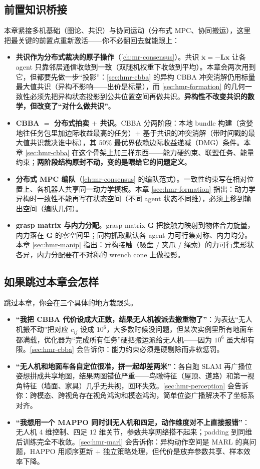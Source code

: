\subsection*{前置知识桥接}
本章紧接多机基础（图论、共识）与协同运动（分布式 MPC、协同搬运），这里把最关键的前置点重新激活——你不必翻回去就能跟上：
\begin{itemize}
  \item \textbf{共识作为分布式裁决的原子操作}（\cref{ch:mr-consensus}）。共识 $\dot{\mathbf{x}}=-\mathbf{L}\mathbf{x}$ 让各 agent 只靠邻居通信收敛到一致（双随机权重下收敛到平均）。本章会两次用到它，但都要先做一步“投影”：\cref{sec:hmr-cbba} 的异构 CBBA 冲突消解仍用标量最大值共识（异构不影响——出价是标量），而 \cref{sec:hmr-formation} 的几何一致性必须先把异构状态投影到公共位置空间再做共识。\textbf{异构性不改变共识的数学，但改变了“对什么做共识”}。
  \item \textbf{CBBA $=$ 分布式拍卖 $+$ 共识}。CBBA 分两阶段：本地 bundle 构建（贪婪地往任务包里加边际收益最高的任务）$+$ 基于共识的冲突消解（带时间戳的最大值共识裁决谁中标），其 $50\%$ 最优界依赖边际收益递减（DMG）条件。本章 \cref{sec:hmr-cbba} 在这个骨架上加三样东西——能力硬约束、联盟任务、能量约束；\textbf{两阶段结构原封不动，变的是喂给它的问题定义}。
  \item \textbf{分布式 MPC 编队}（\cref{ch:mr-consensus} 的编队范式）。一致性约束写在相对位置上、各机器人共享同一动力学模板。本章 \cref{sec:hmr-formation} 指出：动力学异构时一致性不能再写在状态空间（不同 agent 状态不同维），必须上移到输出空间（编队几何）。
  \item \textbf{grasp matrix 与内力分配}。grasp matrix $\mathbf{G}$ 把接触力映射到物体合力旋量，内力落在 $\mathbf{G}$ 的零空间里；同构抓取默认各 agent 力可行集对称、内力均分。本章 \cref{sec:hmr-manip} 指出：异构接触（吸盘 / 夹爪 / 绳索）的力可行集形状各异，内力分配要在不对称的 wrench cone 上做投影。
\end{itemize}

\subsection*{如果跳过本章会怎样}
跳过本章，你会在三个具体的地方栽跟头。
\begin{itemize}
  \item \textbf{“我把 CBBA 代价设成大正数，结果无人机被派去搬重物了”}：为表达“无人机搬不动”把对应 $c_{ij}$ 设成 $10^6$，大多数时候没问题，但某次实例里所有地面车都满载，优化器为“完成所有任务”硬把搬运派给无人机——因为 $10^6$ 虽大却有限。\cref{sec:hmr-cbba} 会告诉你：能力约束必须是硬剔除而非软惩罚。
  \item \textbf{“无人机和地面车各自定位很准，拼一起却差两米”}：各自跑 SLAM 再广播位姿想拼成共享地图，结果两图错位严重——鸟瞰特征（屋顶、道路）和第一视角特征（墙面、家具）几乎无共视，回环失效。\cref{sec:hmr-perception} 会告诉你：跨模态、跨视角存在视角鸿沟和模态鸿沟，简单位姿广播解决不了坐标系对齐。
  \item \textbf{“我想用一个 MAPPO 同时训无人机和四足，动作维度对不上直接报错”}：无人机 $4$ 维控制、四足 $12$ 维关节，参数共享网络搭不起来；padding 到同维后训练完全不收敛。\cref{sec:hmr-marl} 会告诉你：异构动作空间是 MARL 的真问题，HAPPO 用顺序更新 $+$ 独立策略处理，但代价是放弃参数共享、样本效率下降。
\end{itemize}

